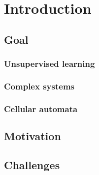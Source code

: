 \chapter{Introduction}

\section{Goal}

\subsection{Unsupervised learning}

\subsection{Complex systems}

\subsection{Cellular automata}

\section{Motivation}
\section{Challenges}

